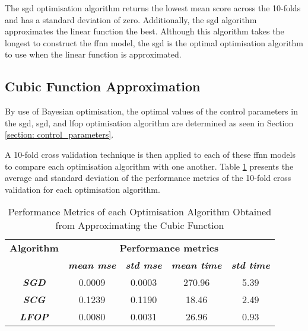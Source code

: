\documentclass[10pt, conference]{IEEEtran}
\begin{document}
The \acrshort{sgd} optimisation algorithm returns the lowest mean score across the 10-folds and has
a standard deviation of zero. Additionally, the \acrshort{sgd} algorithm approximates the linear
function the best. Although this algorithm takes the longest to construct the \acrshort{ffnn} model, the
\acrshort{sgd} is the optimal optimisation algorithm to use when the linear function is approximated.

\subsection{Cubic Function Approximation}

By use of Bayesian optimisation, the optimal values of the control parameters in the
\acrshort{sgd}, \acrshort{sgd}, and \acrshort{lfop} optimisation algorithm are determined as seen in
Section \ref{section: control_parameters}.

A 10-fold cross validation technique is then applied to each of these \acrshort{ffnn} models to compare each
optimisation algorithm with one another. Table \ref{table: Cubic_performance_metrics} presents the average
and standard deviation of the performance metrics of the 10-fold cross validation for each optimisation algorithm.
\begin{table}[H]
    \caption{Performance Metrics of each Optimisation Algorithm Obtained from Approximating the Cubic Function}
    \begin{center}
        \begin{tabular}{|c||c|c|c|c|}
            \hline
            \textbf{Algorithm}&\multicolumn{4}{|c|}{\textbf{Performance metrics}} \\
            \cline{2-5}
                        & \textbf{\textit{mean mse}} & \textbf{\textit{std mse}} & \textbf{\textit{mean time}} & \textbf{\textit{std time}}\\
            \hline
            \textbf{\textit{SGD}}  & 0.0009 & 0.0003 & 270.96 & 5.39\\
            \textbf{\textit{SCG}}  & 0.1239 & 0.1190 & 18.46 & 2.49\\
            \textbf{\textit{LFOP}} & 0.0080 & 0.0031 & 26.96 & 0.93\\
            \hline
        \end{tabular}
    \end{center}
    \label{table: Cubic_performance_metrics}
\end{table}
\end{document}
